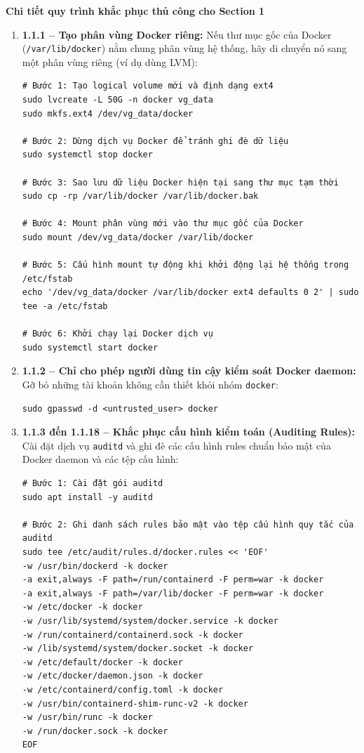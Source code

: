 \noindent\textbf{Chi tiết quy trình khắc phục thủ công cho Section 1}

\begin{enumerate}
    \item \textbf{1.1.1 -- Tạo phân vùng Docker riêng:}
    Nếu thư mục gốc của Docker (\texttt{/var/lib/docker}) nằm chung phân vùng hệ thống, hãy di chuyển nó sang một phân vùng riêng (ví dụ dùng LVM):
{\footnotesize
\begin{verbatim}
# Bước 1: Tạo logical volume mới và định dạng ext4
sudo lvcreate -L 50G -n docker vg_data
sudo mkfs.ext4 /dev/vg_data/docker

# Bước 2: Dừng dịch vụ Docker để tránh ghi đè dữ liệu
sudo systemctl stop docker

# Bước 3: Sao lưu dữ liệu Docker hiện tại sang thư mục tạm thời
sudo cp -rp /var/lib/docker /var/lib/docker.bak

# Bước 4: Mount phân vùng mới vào thư mục gốc của Docker
sudo mount /dev/vg_data/docker /var/lib/docker

# Bước 5: Cấu hình mount tự động khi khởi động lại hệ thống trong /etc/fstab
echo '/dev/vg_data/docker /var/lib/docker ext4 defaults 0 2' | sudo tee -a /etc/fstab

# Bước 6: Khởi chạy lại Docker dịch vụ
sudo systemctl start docker
\end{verbatim}
}

    \item \textbf{1.1.2 -- Chỉ cho phép người dùng tin cậy kiểm soát Docker daemon:}
    Gỡ bỏ những tài khoản không cần thiết khỏi nhóm \texttt{docker}:
{\footnotesize
\begin{verbatim}
sudo gpasswd -d <untrusted_user> docker
\end{verbatim}
}

    \item \textbf{1.1.3 đến 1.1.18 -- Khắc phục cấu hình kiểm toán (Auditing Rules):}
    Cài đặt dịch vụ \texttt{auditd} và ghi đè các cấu hình rules chuẩn bảo mật của Docker daemon và các tệp cấu hình:
{\footnotesize
\begin{verbatim}
# Bước 1: Cài đặt gói auditd
sudo apt install -y auditd

# Bước 2: Ghi danh sách rules bảo mật vào tệp cấu hình quy tắc của auditd
sudo tee /etc/audit/rules.d/docker.rules << 'EOF'
-w /usr/bin/dockerd -k docker
-a exit,always -F path=/run/containerd -F perm=war -k docker
-a exit,always -F path=/var/lib/docker -F perm=war -k docker
-w /etc/docker -k docker
-w /usr/lib/systemd/system/docker.service -k docker
-w /run/containerd/containerd.sock -k docker
-w /lib/systemd/system/docker.socket -k docker
-w /etc/default/docker -k docker
-w /etc/docker/daemon.json -k docker
-w /etc/containerd/config.toml -k docker
-w /usr/bin/containerd-shim-runc-v2 -k docker
-w /usr/bin/runc -k docker
-w /run/docker.sock -k docker
EOF


\end{verbatim}}
\end{enumerate}
